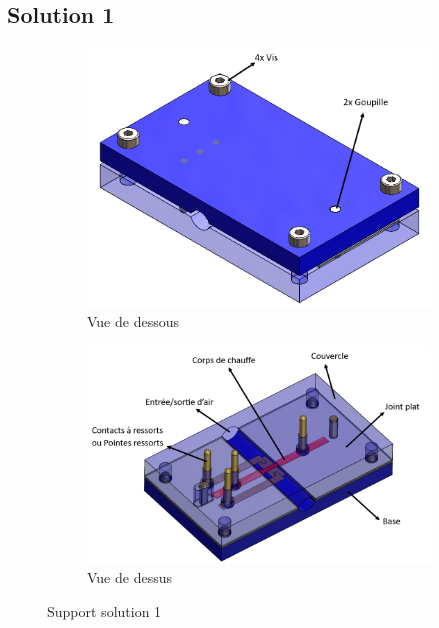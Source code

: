 \subsection{Solution 1}
\begin{figure}[H]
    \hspace{-0.5cm}
    \begin{subfigure}{0.45\textwidth}
        \includegraphics[scale = 0.3]{images/Design1_dessous.png}
        \caption{Vue de dessous}
    \end{subfigure}
    \begin{subfigure}{0.45\textwidth}
        \includegraphics[scale = 0.45]{images/Design1_dessus.png}
        \caption{Vue de dessus}
    \end{subfigure}
    \caption{Support solution 1}
    \label{fig:solution1}
\end{figure}

